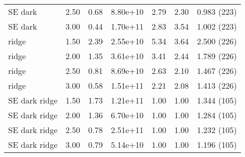 \documentclass[twocolumn,tighten,trackchanges]{aastex6}
\begin{document}
\begin{table*}
\begin{tabular}{@{}lrrrrrr@{}}
        SE dark & 2.50 & 0.68 & 8.80e+10 & 2.79 & 2.30 & 0.983 (223) \\  %
        SE dark & 3.00 & 0.44 & 1.70e+11 & 2.83 & 3.54 & 1.002 (223) \\  %
        \midrule
        ridge & 1.50 & 2.39 & 2.55e+10 & 5.34 & 3.64 & 2.500 (226) \\  %
        ridge & 2.00 & 1.35 & 3.61e+10 & 3.41 & 2.44 & 1.789 (226) \\  %
        ridge & 2.50 & 0.81 & 8.69e+10 & 2.63 & 2.10 & 1.467 (226) \\  %
        ridge & 3.00 & 0.58 & 1.51e+11 & 2.21 & 2.08 & 1.413 (226) \\  %
        \midrule
        SE dark ridge & 1.50 & 1.73 & 1.21e+11 & 1.00 & 1.00 & 1.344 (105) \\  %
        SE dark ridge & 2.00 & 1.36 & 6.70e+10 & 1.00 & 1.00 & 1.284 (105) \\  %
        SE dark ridge & 2.50 & 0.78 & 2.51e+11 & 1.00 & 1.00 & 1.232 (105) \\  %
        SE dark ridge & 3.00 & 0.79 & 5.14e+10 & 1.00 & 1.00 & 1.196 (105) \\  %
        \bottomrule
    \end{tabular}
\end{table*}
\end{document}

